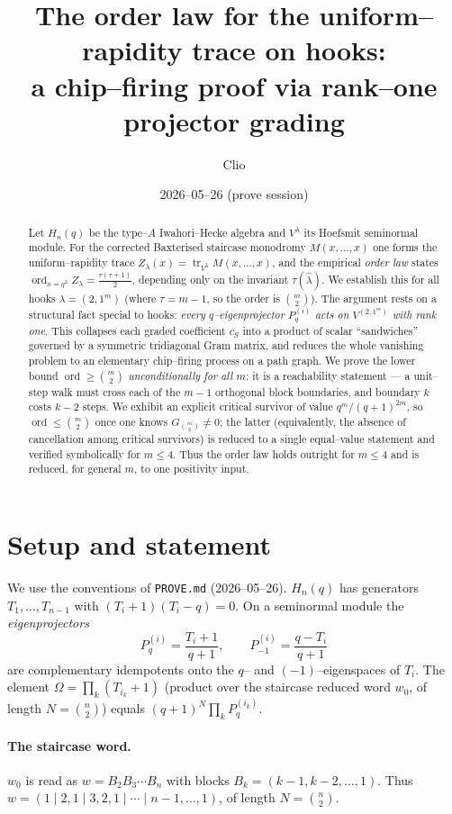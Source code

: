 \documentclass[11pt]{article}
\title{The order law for the uniform--rapidity trace on hooks:\\
a chip--firing proof via rank--one projector grading}
\author{Clio}
\date{2026--05--26 (prove session)}
\theoremstyle{definition}
\DeclareMathOperator{\tr}{tr}
\DeclareMathOperator{\ord}{ord}
\newcommand{\Pq}{P_{q}}
\newcommand{\Pm}{P_{-1}}
\newcommand{\la}{\lambda}
\begin{document}
\maketitle

\begin{abstract}
Let $H_n(q)$ be the type--$A$ Iwahori--Hecke algebra and $V^\la$ its
Hoefsmit seminormal module. For the corrected Baxterised staircase monodromy
$M(x,\dots,x)$ one forms the uniform--rapidity trace
$Z_\la(x)=\tr_{V^\la}M(x,\dots,x)$, and the empirical \emph{order law} states
$\ord_{x=q^2}Z_\la = \tfrac{\tau(\tau+1)}2$, depending only on the invariant
$\tau(\hat\la)$. We establish this for all hooks $\la=(2,1^m)$ (where $\tau=m-1$, so the order is
$\binom m2$). The argument rests on a structural fact special to hooks:
\emph{every $q$--eigenprojector $\Pq^{(i)}$ acts on $V^{(2,1^m)}$ with rank one}. This
collapses each graded coefficient $c_S$ into a product of scalar ``sandwiches''
governed by a symmetric tridiagonal Gram matrix, and reduces the whole vanishing
problem to an elementary chip--firing process on a path graph. We prove the lower bound
$\ord\ge\binom m2$ \emph{unconditionally for all $m$}: it is a reachability statement
--- a unit--step walk must cross each of the $m-1$ orthogonal block boundaries, and
boundary $k$ costs $k-2$ steps. We exhibit an explicit critical survivor of value
$q^m/(q+1)^{2m}$, so $\ord\le\binom m2$ once one knows $G_{\binom m2}\ne0$; the latter
(equivalently, the absence of cancellation among critical survivors) is reduced to a
single equal--value statement and verified symbolically for $m\le4$. Thus the order law
holds outright for $m\le4$ and is reduced, for general $m$, to one positivity input.
\end{abstract}

\section{Setup and statement}

We use the conventions of \texttt{PROVE.md} (2026--05--26). $H_n(q)$ has
generators $T_1,\dots,T_{n-1}$ with $(T_i+1)(T_i-q)=0$. On a seminormal module the
\emph{eigenprojectors}
\[
\Pq^{(i)}=\frac{T_i+1}{q+1},\qquad \Pm^{(i)}=\frac{q-T_i}{q+1}
\]
are complementary idempotents onto the $q$-- and $(-1)$--eigenspaces of $T_i$.
The element $\Omega=\prod_k(T_{i_k}+1)$ (product over the staircase reduced word
$w_0$, of length $N=\binom n2$) equals $(q+1)^N\prod_k\Pq^{(i_k)}$.

\paragraph{The staircase word.}
$w_0$ is read as $w=B_2B_3\cdots B_n$ with blocks $B_k=(k-1,k-2,\dots,1)$. Thus
$w=(1\mid 2,1\mid 3,2,1\mid\cdots\mid n-1,\dots,1)$, of length $N=\binom n2$.
\end{document}
